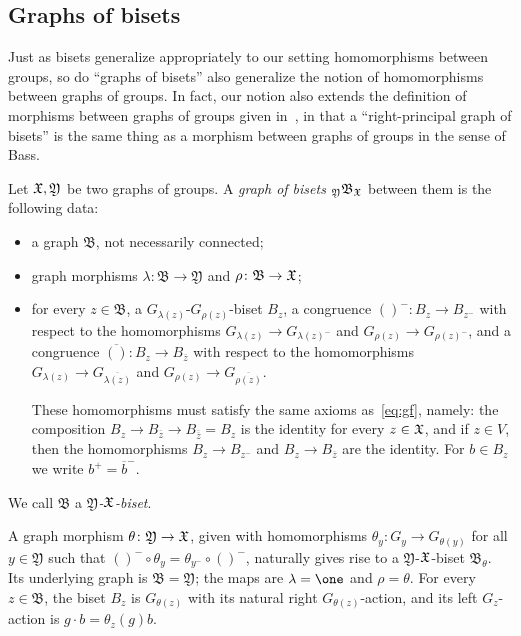 \documentclass{amsart}
\begin{document}
\subsection{Graphs of bisets}
Just as bisets generalize appropriately to our setting homomorphisms
between groups, so do ``graphs of bisets'' also generalize the notion
of homomorphisms between graphs of groups. In fact, our notion also
extends the definition of morphisms between graphs of groups given
in~\cite{bass:covering}, in that a ``right-principal graph of bisets''
is the same thing as a morphism between graphs of groups in the sense
of Bass.

\begin{defn}\label{defn:graphofbisets}
  Let ${\mathfrak X},\mathfrak Y$ be two graphs of groups. A \emph{graph of
    bisets} ${}_{\mathfrak Y}\mathfrak B_{\mathfrak X}$ between them is the
  following data:
  \begin{itemize}
  \item a graph $\mathfrak B$, not necessarily connected;
  \item graph morphisms $\lambda\colon\mathfrak B\to\mathfrak Y$ and
    $\rho\colon\mathfrak B\to{\mathfrak X}$;
  \item for every $z\in\mathfrak B$, a
    $G_{\lambda(z)}$-$G_{\rho(z)}$-biset $B_z$, a congruence
    $()^-\colon B_z\to B_{z^-}$ with respect to the homomorphisms
    $G_{\lambda(z)}\to G_{\lambda(z)^-}$ and $G_{\rho(z)}\to
    G_{\rho(z)^-}$, and a congruence $\overline{()}\colon B_z\to B_{\overline
      z}$ with respect to the homomorphisms $G_{\lambda(z)}\to
    G_{\overline{\lambda(z)}}$ and $G_{\rho(z)}\to
    G_{\overline{\rho(z)}}$.

    These homomorphisms must satisfy the same axioms as~\eqref{eq:gf},
    namely: the composition $B_z\to B_{\overline z}\to
    B_{\overline{\overline z}}=B_z$ is the identity for every
    $z\in{\mathfrak X}$, and if $z\in V$, then the homomorphisms $B_z\to B_{z^-}$
    and $B_z\to B_{\overline z}$ are the identity. For $b\in B_z$ we
    write $b^+={\overline b}^-$.
  \end{itemize}
  We call $\mathfrak B$ a \emph{$\mathfrak Y$-${\mathfrak X}$-biset}.
\end{defn}

\begin{exple}\label{ex:map=biset}
  A graph morphism $\theta\colon\mathfrak Y\to{\mathfrak X}$, given with homomorphisms
  $\theta_y\colon G_y\to G_{\theta(y)}$ for all $y\in\mathfrak Y$ such that $()^{-} \circ \theta_y= \theta_{y^-}\circ ()^{-}$, naturally
  gives rise to a $\mathfrak Y$-${\mathfrak X}$-biset $\mathfrak B_\theta$. Its
  underlying graph is $\mathfrak B=\mathfrak Y$; the maps are
  $\lambda=\one$ and $\rho=\theta$. For every $z\in\mathfrak B$, the biset
  $B_z$ is $G_{\theta(z)}$ with its natural right $G_{\theta(z)}$-action,
  and its left $G_z$-action is $g\cdot b=\theta_z(g)b$.
\end{exple}
\end{document}
